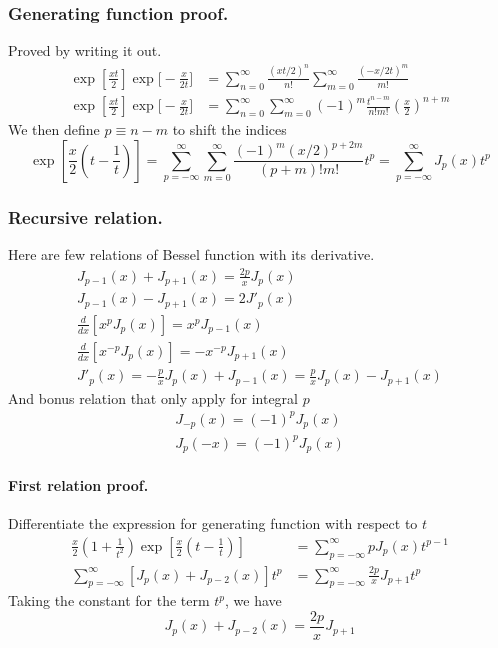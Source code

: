 \documentclass[../main.tex]{subfiles}
\begin{document}
\subsubsection*{Generating function proof.} Proved by writing it out.
\begin{align*}
    \exp\left[\frac{xt}{2}\right] \exp\bigg[-\frac{x}{2t}\bigg] & =\sum_{n=0}^{\infty}\frac{(xt/2)^n}{n!}\sum_{m=0}^{\infty} \frac{(-x/2t)^m}{m!}                 \\
    \exp\left[\frac{xt}{2}\right] \exp\bigg[-\frac{x}{2t}\bigg] & =\sum_{n=0}^{\infty}\sum_{m=0}^{\infty}(-1)^m\frac{t^{n-m}}{n!m!}\left(\frac{x}{2}\right)^{n+m}
\end{align*}
We then define $p\equiv n-m$ to shift the indices
\begin{equation*}
    \exp\left[\frac{x}{2}\left(t-\frac{1}{t}\right)\right]= \sum_{p=-\infty}^{\infty}\sum_{m=0}^{\infty}\frac{(-1)^m(x/2)^{p+2m}}{(p+m)!m!}t^p=\sum_{p=-\infty}^{\infty}J_p(x)t^p
\end{equation*}

\subsubsection*{Recursive relation.} Here are few relations of Bessel function with its derivative.
\begin{gather*}
    J_{p-1}(x)+J_{p+1}(x)=\frac{2p}{x}J_p(x)\\
    J_{p-1}(x)- J_{p+1}(x)=2J'_p(x)\\
    \frac{d}{dx}[x^pJ_p(x)]=x^pJ_{p-1}(x)\\
    \frac{d}{dx}[x^{-p}J_p(x)]=-x^{-p}J_{p+1}(x)\\
    J'_p(x)=-\frac{p}{x}J_p(x)+J_{p-1}(x)=\frac{p}{x}J_p(x)-J_{p+1}(x)
\end{gather*}
And bonus relation that only apply for integral $p$
\begin{gather*}
    J_{-p}(x)=(-1)^pJ_p(x)\\
    J_p(-x)=(-1)^pJ_p(x)
\end{gather*}


\paragraph*{First relation proof.} Differentiate the expression for generating function with respect to $t$
\begin{align*}
    \frac{x}{2}\left(1+\frac{1}{t^2}\right)\exp\left[\frac{x}{2}\left(t-\frac{1}{t}\right)\right] & =\sum_{p=-\infty}^{\infty}pJ_p(x)t^{p-1}            \\
    \sum_{p=-\infty}^{\infty}\left[J_p(x)+J_{p-2}(x)\right]t^p                                    & = \sum_{p=-\infty}^{\infty}\frac{2p}{x}J_{p+1}t^{p}
\end{align*}
Taking the constant for the term $t^p$, we have
\begin{equation*}
    J_p(x)+J_{p-2}(x)=\frac{2p}{x}J_{p+1}
\end{equation*}
\end{document}
